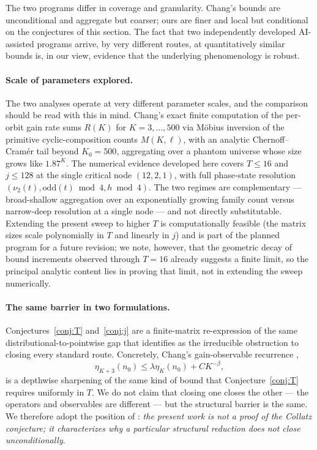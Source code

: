 \documentclass[11pt,a4paper]{article}
\theoremstyle{definition}
\begin{document}
The two programs differ in coverage and granularity. Chang's
bounds are unconditional and aggregate but coarser; ours are
finer and local but conditional on the conjectures of this
section. The fact that two independently developed AI-assisted
programs arrive, by very different routes, at quantitatively
similar bounds is, in our view, evidence that the underlying
phenomenology is robust.

\paragraph{Scale of parameters explored.}
The two analyses operate at very different parameter scales, and
the comparison should be read with this in mind. Chang's exact
finite computation of the per-orbit gain rate
\cite[Theorem~7.19, Step 2]{chang2026} sums $R(K)$ for
$K = 3, \ldots, 500$ via M\"obius inversion of the primitive
cyclic-composition counts $M(K, \ell)$, with an analytic
Chernoff--Cram\'er tail beyond $K_0 = 500$, aggregating over a
phantom universe whose size grows like $1.87^K$. The numerical
evidence developed here covers $T \le 16$ and $j \le 128$ at the
single critical node $(12, 2, 1)$, with full phase-state resolution
$(\nu_2(t), \mathrm{odd}(t) \bmod 4, h \bmod 4)$. The two regimes
are complementary --- broad-shallow aggregation over an
exponentially growing family count versus narrow-deep resolution
at a single node --- and not directly substitutable. Extending
the present sweep to higher $T$ is computationally feasible (the
matrix sizes scale polynomially in $T$ and linearly in $j$) and
is part of the planned program for a future revision; we note,
however, that the geometric decay of bound increments observed
through $T = 16$ already suggests a finite limit, so the principal
analytic content lies in proving that limit, not in extending the
sweep numerically.

\paragraph{The same barrier in two formulations.}
Conjectures~\ref{conj:T} and~\ref{conj:j} are a finite-matrix
re-expression of the same distributional-to-pointwise gap that
\cite[Sect.~9]{chang2026} identifies as the irreducible obstruction
to closing every standard route. Concretely, Chang's gain-observable
recurrence \cite[Conj.~9.18]{chang2026},
\[
\eta_{K+3}(n_0) \le \lambda \eta_K(n_0) + C K^{-\beta},
\]
is a depthwise sharpening of the same kind of bound that
Conjecture~\ref{conj:T} requires uniformly in $T$. We do not claim
that closing one closes the other --- the operators and observables
are different --- but the structural barrier is the same. We
therefore adopt the position of \cite{chang2026}: \emph{the present
work is not a proof of the Collatz conjecture; it characterizes
why a particular structural reduction does not close
unconditionally}.
\end{document}
